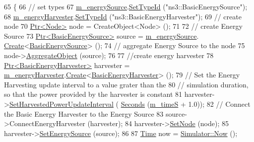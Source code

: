 \begin{DoxyCode}
65 \{
66         \textcolor{comment}{// set types}
67         \hyperlink{classBasicEnergyHarvesterTestCase_a584587fe08d8a8ba0efe8da4acbb69dc}{m\_energySource}.\hyperlink{classns3_1_1ObjectFactory_a77dcd099064038a1eb7a6b8251229ec3}{SetTypeId} (\textcolor{stringliteral}{"ns3::BasicEnergySource"});
68         \hyperlink{classBasicEnergyHarvesterTestCase_a690155e18bc90086f4bc116bc522a717}{m\_energyHarvester}.\hyperlink{classns3_1_1ObjectFactory_a77dcd099064038a1eb7a6b8251229ec3}{SetTypeId} (\textcolor{stringliteral}{"ns3::BasicEnergyHarvester"});
69   \textcolor{comment}{// create node}
70   \hyperlink{classns3_1_1Ptr}{Ptr<Node>} node = CreateObject<Node> ();
71 
72   \textcolor{comment}{// create Energy Source}
73   \hyperlink{classns3_1_1Ptr}{Ptr<BasicEnergySource>} source = \hyperlink{classBasicEnergyHarvesterTestCase_a584587fe08d8a8ba0efe8da4acbb69dc}{m\_energySource}.
      \hyperlink{classns3_1_1ObjectFactory_a18152e93f0a6fe184ed7300cb31e9896}{Create}<\hyperlink{classns3_1_1BasicEnergySource}{BasicEnergySource}> ();
74   \textcolor{comment}{// aggregate Energy Source to the node}
75   node->\hyperlink{classns3_1_1Object_a79dd435d300f3deca814553f561a2922}{AggregateObject} (source);
76 
77   \textcolor{comment}{//create energy harvester}
78   \hyperlink{classns3_1_1Ptr}{Ptr<BasicEnergyHarvester>} harvester = 
      \hyperlink{classBasicEnergyHarvesterTestCase_a690155e18bc90086f4bc116bc522a717}{m\_energyHarvester}.\hyperlink{classns3_1_1ObjectFactory_a18152e93f0a6fe184ed7300cb31e9896}{Create}<\hyperlink{classns3_1_1BasicEnergyHarvester}{BasicEnergyHarvester}> ();
79   \textcolor{comment}{// Set the Energy Harvesting update interval to a value grater than the}
80   \textcolor{comment}{// simulation duration, so that the power provided by the harvester is constant}
81   harvester->\hyperlink{classns3_1_1BasicEnergyHarvester_a6e50dec1a1903c158ed701f2dfbe911c}{SetHarvestedPowerUpdateInterval} (
      \hyperlink{group__timecivil_ga33c34b816f8ff6628e33d5c8e9713b9e}{Seconds} (\hyperlink{classBasicEnergyHarvesterTestCase_a7fb984119deb87b873e2ca42744ac8d5}{m\_timeS} + 1.0));
82         \textcolor{comment}{// Connect the Basic Energy Harvester to the Energy Source}
83         source->ConnectEnergyHarvester (harvester);
84         harvester->\hyperlink{classns3_1_1EnergyHarvester_ad479141b1019ee683615272e807e529c}{SetNode} (node);
85         harvester->\hyperlink{classns3_1_1EnergyHarvester_ad659bea785a5d3de63f2d9c767e809ab}{SetEnergySource} (source);
86 
87   \hyperlink{classns3_1_1Time}{Time} now = \hyperlink{group__simulator_gac3635e2e87f7ce316c89290ee1b01d0d}{Simulator::Now} ();

\end{DoxyCode}
